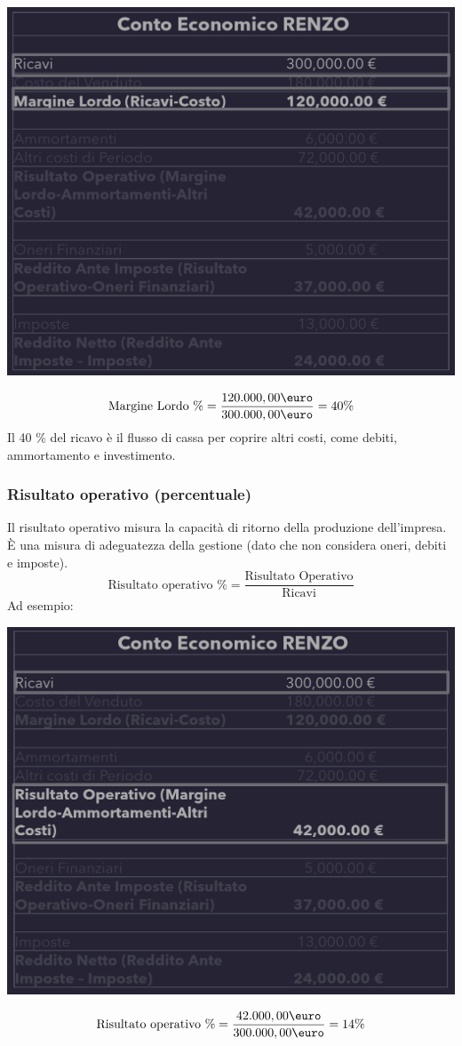 \documentclass{article}
\begin{document}
\begin{center}
    \includegraphics[scale=0.25]{Image/MargineLordo_2.png}
\end{center}
\[
    \text{Margine Lordo \%} = \frac{120.000,00 \text{\euro}}{300.000,00 \text{\euro}} = 40 \%
\]
Il 40 \% del ricavo è il flusso di cassa per coprire altri costi, come debiti, ammortamento e investimento.



\subsubsection{Risultato operativo (percentuale)}
Il risultato operativo misura la capacità di ritorno della produzione dell'impresa. È una misura di adeguatezza della gestione (dato che non considera oneri, debiti e imposte).
\[
    \text{Risultato operativo \%} = \frac{\text{Risultato Operativo}}{\text{Ricavi}}
\]
Ad esempio:
\begin{center}
    \includegraphics[scale=0.3]{Image/RisultatoOperPer.png}
\end{center}
\[
    \text{Risultato operativo \%} = \frac{42.000,00 \text{\euro}}{300.000,00\text{\euro}} = 14\%
\]
\end{document}
